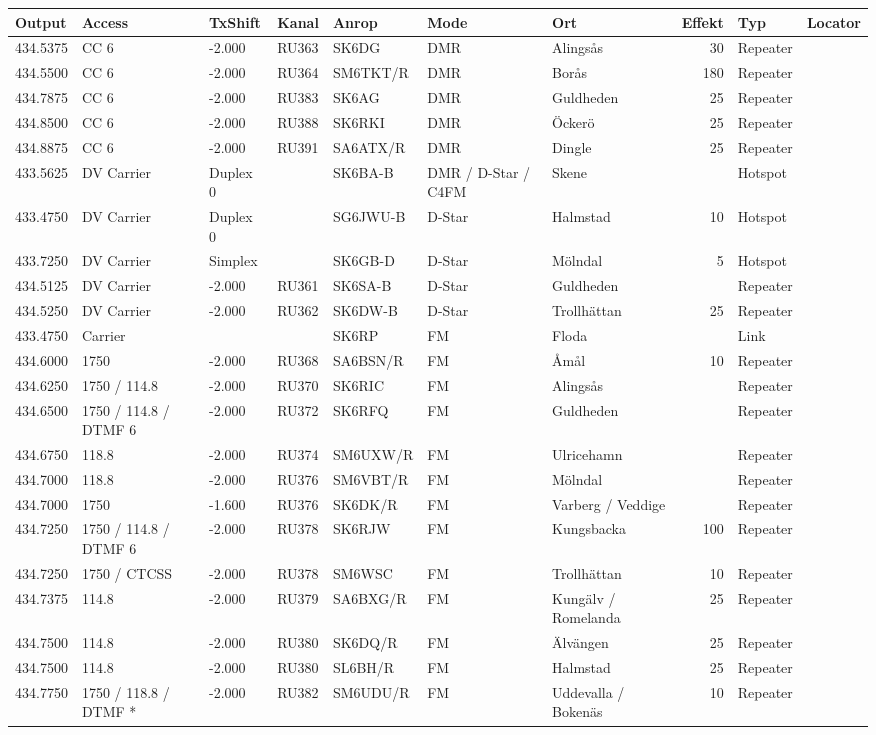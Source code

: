 \begin{longtable}{lllllllrlr}
Output & Access & TxShift & Kanal & Anrop & Mode & Ort & Effekt & Typ & Locator \\ \hline
434.5375&CC 6&-2.000&RU363&SK6DG&DMR&Alingsås&30&Repeater&\\
434.5500&CC 6&-2.000&RU364&SM6TKT/R&DMR&Borås&180&Repeater&\\
434.7875&CC 6&-2.000&RU383&SK6AG&DMR&Guldheden&25&Repeater&\\
434.8500&CC 6&-2.000&RU388&SK6RKI&DMR&Öckerö&25&Repeater&\\
434.8875&CC 6&-2.000&RU391&SA6ATX/R&DMR&Dingle &25&Repeater&\\
433.5625&DV Carrier&Duplex 0&&SK6BA-B&DMR / D-Star / C4FM&Skene&&Hotspot&\\
433.4750&DV Carrier&Duplex 0&&SG6JWU-B&D-Star&Halmstad&10&Hotspot&\\
433.7250&DV Carrier&Simplex&&SK6GB-D&D-Star&Mölndal&5&Hotspot&\\
434.5125&DV Carrier&-2.000&RU361&SK6SA-B&D-Star&Guldheden&&Repeater&\\
434.5250&DV Carrier&-2.000&RU362&SK6DW-B&D-Star&Trollhättan&25&Repeater&\\
433.4750&Carrier&&&SK6RP&FM&Floda&&Link&\\
434.6000&1750&-2.000&RU368&SA6BSN/R&FM&Åmål&10&Repeater&\\
434.6250&1750 / 114.8&-2.000&RU370&SK6RIC&FM&Alingsås&&Repeater&\\
434.6500&1750 / 114.8 / DTMF 6&-2.000&RU372&SK6RFQ&FM&Guldheden&&Repeater&\\
434.6750&118.8&-2.000&RU374&SM6UXW/R&FM&Ulricehamn&&Repeater&\\
434.7000&118.8&-2.000&RU376&SM6VBT/R&FM&Mölndal&&Repeater&\\
434.7000&1750&-1.600&RU376&SK6DK/R&FM&Varberg / Veddige&&Repeater&\\
434.7250&1750 / 114.8 / DTMF 6&-2.000&RU378&SK6RJW&FM&Kungsbacka&100&Repeater&\\
434.7250&1750 / CTCSS&-2.000&RU378&SM6WSC&FM&Trollhättan&10&Repeater&\\
434.7375&114.8&-2.000&RU379&SA6BXG/R&FM&Kungälv / Romelanda&25&Repeater&\\
434.7500&114.8&-2.000&RU380&SK6DQ/R&FM&Älvängen&25&Repeater&\\
434.7500&114.8&-2.000&RU380&SL6BH/R&FM&Halmstad&25&Repeater&\\
434.7750&1750 / 118.8 / DTMF *&-2.000&RU382&SM6UDU/R&FM&Uddevalla / Bokenäs&10&Repeater&\\

\end{longtable}
